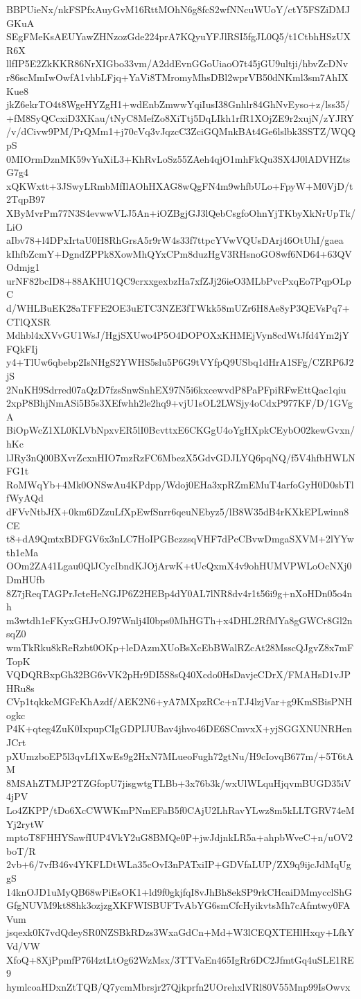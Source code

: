 BBPUieNx/nkFSPfxAuyGvM16RttMOhN6g8fcS2wfNNcuWUoY/ctY5FSZiDMJGKuA
SEgFMeKsAEUYawZHNzozGde224prA7KQyuYFJlRSI5fgJL0Q5/t1CtbhHSzUXR6X
llfIP5E2ZkKKR86NrXIGbo33vm/A2ddEvnGGoUiaoO7t45jGU9ultji/hbvZcDNv
r86scMmIwOwfA1vhbLFjq+YaVi8TMromyMhsDBl2wprVB50dNKml3sm7AhIXKue8
jkZ6ekrTO4t8WgeHYZgH1+wdEnbZmwwYqiIusI38Gnhlr84GhNvEyso+z/lss35/
+fM8SyQCcxiD3XKau/tNyC8MefZo8XiTtj5DqLIkh1rfR1XOjZE9r2xujN/zYJRY
/v/dCivw9PM/PrQMm1+j70cVq3vJqzcC3ZciGQMnkBAt4Ge6lslbk3SSTZ/WQQpS
0MIOrmDznMK59vYuXiL3+KhRvLoSz55ZAeh4qjO1mhFkQu3SX4J0lADVHZtsG7g4
xQKWxtt+3JSwyLRmbMfIlAOhHXAG8wQgFN4m9whfbULo+FpyW+M0VjD/t2TqpB97
XByMvrPm77N3S4evwwVLJ5An+iOZBgjGJ3lQebCsgfoOhnYjTKbyXkNrUpTk/LiO
aIbv78+l4DPxIrtaU0H8RhGrsA5r9rW4s33f7ttpcYVwVQUsDArj46OtUhI/gaea
kIhfbZcmY+DgndZPPk8XowMhQYxCPm8duzHgV3RHsnoGO8wf6ND64+63QVOdmjg1
urNF82bcID8+88AKHU1QC9crxxgexbzHa7xfZJj26ieO3MLbPvcPxqEo7PqpOLpC
d/WHLBuEK28aTFFE2OE3uETC3NZE3fTWkk58mUZr6H8Ae8yP3QEVsPq7+CTlQXSR
Mdhbl4xXVvGU1WsJ/HgjSXUwo4P5O4DOPOXxKHMEjVyn8cdWtJfd4Ym2jYFQkFIj
y4+TlUw6qbebp2IsNHgS2YWHS5slu5P6G9tVYfpQ9USbq1dHrA1SFg/CZRP6J2jS
2NnKH9Sdrred07aQzD7fzsSnwSnhEX97N5i6kxcewvdP8PaPFpiRFwEttQac1qiu
2xpP8BhjNmASi5B5s3XEfwhh2le2hq9+vjU1sOL2LWSjy4oCdxP977KF/D/1GVgA
BiOpWcZ1XL0KLVbNpxvER5lI0BcvttxE6CKGgU4oYgHXpkCEybO02kewGvxn/hKc
lJRy3nQ00BXvrZcxnHIO7mzRzFC6MbezX5GdvGDJLYQ6pqNQ/f5V4hfbHWLNFG1t
RoMWqYb+4Mk0ONSwAu4KPdpp/Wdoj0EHa3xpRZmEMuT4arfoGyH0D0sbTlfWyAQd
dFVvNtbJfX+0km6DZzuLfXpEwfSnrr6qeuNEbyz5/lB8W35dB4rKXkEPLwinn8CE
t8+dA9QmtxBDFGV6x3nLC7HoIPGBczzsqVHF7dPcCBvwDmgaSXVM+2lYYwth1eMa
OOm2ZA41Lgau0QlJCycIbndKJOjArwK+tUcQxmX4v9ohHUMVPWLoOcNXj0DmHUfb
8Z7jReqTAGPrJcteHeNGJP6Z2HEBp4dY0AL7lNR8dv4r1t56i9g+nXoHDn05o4nh
m3wtdh1eFKyxGHJvOJ97Wnlj4I0bps0MhHGTh+x4DHL2RfMYa8gGWCr8Gl2nsqZ0
wmTkRku8kReRzbt0OKp+leDAzmXUoBsXcEbBWalRZcAt28MsscQJgvZ8x7mFTopK
VQDQRBxpGh32BG6vVK2pHr9DI5S8sQ40Xcdo0HsDavjeCDrX/FMAHsD1vJPHRu8s
CVp1tqkkcMGFcKhAzdf/AEK2N6+yA7MXpzRCc+nTJ4lzjVar+g9KmSBisPNHogkc
P4K+qteg4ZuK0IxpupCIgGDPIJUBav4jhvo46DE6SCmvxX+yjSGGXNUNRHenJCrt
pXUmzboEP5l3qvLf1XwEs9g2HxN7MLueoFugh72gtNu/H9cIovqB677m/+5T6tAM
8MSAhZTMJP2TZGfopU7jisgwtgTLBb+3x76b3k/wxUlWLquHjqvmBUGD35iV4jPV
Lo4ZKPP/tDo6XcCWWKmPNmEFaB5f0CAjU2LhRavYLwz8m5kLLTGRV74eMYj2rytW
mptoT8FHHYSawfIUP4VkY2uG8BMQe0P+jwJdjnkLR5a+ahpbWveC+n/uOV2boT/R
2vb+6/7vfB46v4YKFLDtWLa35cOvI3nPATxiIP+GDVfaLUP/ZX9q9ijcJdMqUggS
14knOJD1uMyQB68wPiEsOK1+ld9f0gkjfqI8vJhBh8ekSP9rkCHcaiDMmycclShG
GfgNUVM9kt88hk3ozjzgXKFWISBUFTvAbYG6smCfcHyikvtsMh7cAfmtwy0FAVum
jsqexk0K7vdQdeySR0NZSBkRDzs3WxaGdCn+Md+W3lCEQXTEHlHxqy+LfkYVd/VW
XfoQ+8XjPpmfP76l4ztLtOg62WzMsx/3TTVaEn465IgRr6DC2JfmtGq4uSLE1RE9
hymlcoaHDxnZtTQB/Q7ycmMbrsjr27Qjkprfn2UOrehxlVRl80V55Mnp99IsOwvx
